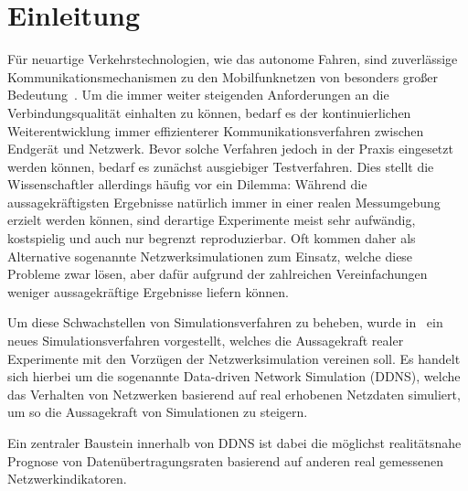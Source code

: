 \section{Einleitung}

F\"ur neuartige Verkehrstechnologien, wie das autonome Fahren, sind zuverl\"assige Kommunikationsmechanismen
zu den Mobilfunknetzen von besonders gro{\ss}er Bedeutung~\cite{IEEE}.
Um die immer weiter steigenden Anforderungen an die Verbindungsqualit\"at einhalten zu k\"onnen, bedarf es
der kontinuierlichen Weiterentwicklung immer effizienterer Kommunikationsverfahren zwischen Endger\"at und Netzwerk.
Bevor solche Verfahren jedoch in der Praxis eingesetzt werden k\"onnen, bedarf es zun\"achst ausgiebiger Testverfahren.
Dies stellt die Wissenschaftler allerdings h\"aufig vor ein Dilemma: W\"ahrend die aussagekr\"aftigsten Ergebnisse nat\"urlich
immer in einer realen Messumgebung erzielt werden k\"onnen, sind derartige Experimente meist sehr aufw\"andig, kostspielig und
auch nur begrenzt reproduzierbar.
Oft kommen daher als Alternative sogenannte Netzwerksimulationen zum Einsatz, welche diese Probleme zwar l\"osen, aber daf\"ur
aufgrund der zahlreichen Vereinfachungen weniger aussagekr\"aftige Ergebnisse liefern k\"onnen.

Um diese Schwachstellen von Simulationsverfahren zu beheben, wurde in~\cite{IEEE} ein neues Simulationsverfahren vorgestellt,
welches die Aussagekraft realer Experimente
mit den Vorz\"ugen der Netzwerksimulation vereinen soll. Es handelt sich hierbei um die sogenannte Data-driven Network Simulation (DDNS),
welche das Verhalten von Netzwerken basierend auf real erhobenen Netzdaten simuliert, um so die Aussagekraft von Simulationen zu steigern.

Ein zentraler Baustein innerhalb von DDNS ist dabei die m\"oglichst realit\"atsnahe Prognose von Daten\"ubertragungsraten basierend
auf anderen real gemessenen Netzwerkindikatoren.
